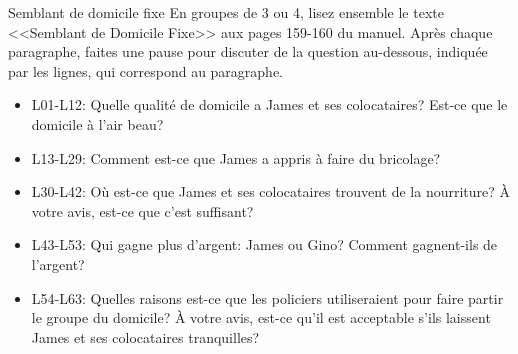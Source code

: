 \begin{frame}{Semblant de domicile fixe}
  \small
  En groupes de 3 ou 4, lisez ensemble le texte <<Semblant de Domicile Fixe>> aux pages 159-160 du manuel.
  Après chaque paragraphe, faites une pause pour discuter de la question au-dessous, indiquée par les lignes, qui correspond au paragraphe.
  \begin{itemize}
    \item[] L01-L12: Quelle qualité de domicile a James et ses colocataires? Est-ce que le domicile à l'air beau?
    \item[] L13-L29: Comment est-ce que James a appris à faire du bricolage?
    \item[] L30-L42: Où est-ce que James et ses colocataires trouvent de la nourriture? À votre avis, est-ce que c'est suffisant?
    \item[] L43-L53: Qui gagne plus d'argent: James ou Gino? Comment gagnent-ils de l'argent?
    \item[] L54-L63: Quelles raisons est-ce que les policiers utiliseraient pour faire partir le groupe du domicile? À votre avis, est-ce qu'il est acceptable s'ils laissent James et ses colocataires tranquilles?
  \end{itemize}
\end{frame}